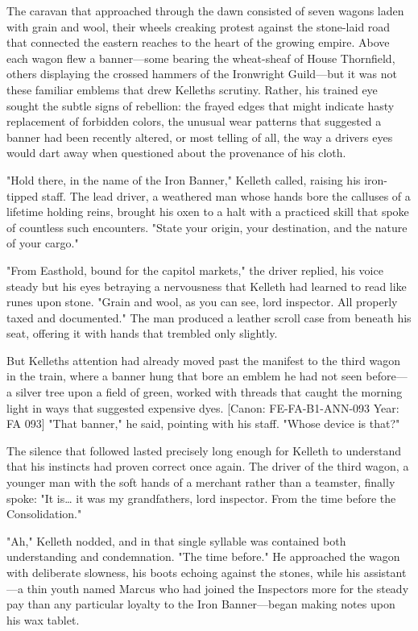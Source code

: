 The caravan that approached through the dawn consisted of seven wagons
laden with grain and wool, their wheels creaking protest against the
stone-laid road that connected the eastern reaches to the heart of the
growing empire. Above each wagon flew a banner---some bearing the
wheat-sheaf of House Thornfield, others displaying the crossed hammers
of the Ironwright Guild---but it was not these familiar emblems that
drew Kelleth\textquotesingle s scrutiny. Rather, his trained eye sought
the subtle signs of rebellion: the frayed edges that might indicate
hasty replacement of forbidden colors, the unusual wear patterns that
suggested a banner had been recently altered, or most telling of all,
the way a driver\textquotesingle s eyes would dart away when questioned
about the provenance of his cloth.

"Hold there, in the name of the Iron Banner," Kelleth called, raising
his iron-tipped staff. The lead driver, a weathered man whose hands bore
the calluses of a lifetime holding reins, brought his oxen to a halt
with a practiced skill that spoke of countless such encounters. "State
your origin, your destination, and the nature of your cargo."

"From Easthold, bound for the capitol markets," the driver replied, his
voice steady but his eyes betraying a nervousness that Kelleth had
learned to read like runes upon stone. "Grain and wool, as you can see,
lord inspector. All properly taxed and documented." The man produced a
leather scroll case from beneath his seat, offering it with hands that
trembled only slightly.

But Kelleth\textquotesingle s attention had already moved past the
manifest to the third wagon in the train, where a banner hung that bore
an emblem he had not seen before---a silver tree upon a field of green,
worked with threads that caught the morning light in ways that suggested
expensive dyes. {[}Canon: FE-FA-B1-ANN-093 \textbar{} Year: FA 093{]}
"That banner," he said, pointing with his staff. "Whose device is that?"

The silence that followed lasted precisely long enough for Kelleth to
understand that his instincts had proven correct once again. The driver
of the third wagon, a younger man with the soft hands of a merchant
rather than a teamster, finally spoke: "It is\ldots{} it was my
grandfather\textquotesingle s, lord inspector. From the time before the
Consolidation."

"Ah," Kelleth nodded, and in that single syllable was contained both
understanding and condemnation. "The time before." He approached the
wagon with deliberate slowness, his boots echoing against the stones,
while his assistant---a thin youth named Marcus who had joined the
Inspectors more for the steady pay than any particular loyalty to the
Iron Banner---began making notes upon his wax tablet.

